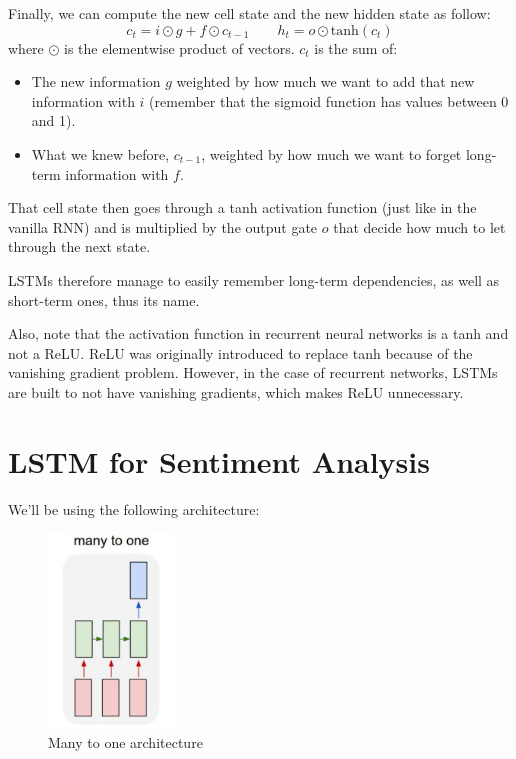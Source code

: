 Finally, we can compute the new cell state and the new hidden state as follow:
\begin{equation}
     c_t = i\odot g + f\odot c_{t-1} \qquad h_t = o\odot \text{tanh}(c_t)
\end{equation}
where $\odot$ is the elementwise product of vectors.
$c_t$ is the sum of:
\begin{itemize}
    \item The new information $g$ weighted by how much we want to add that new information with $i$ (remember that the sigmoid function has values between 0 and 
    1).
    \item What we knew before, $c_{t-1}$, weighted by how much we want to forget long-term information with $f$.
\end{itemize} 
That cell state then goes through a tanh activation function (just like in the vanilla RNN) and is multiplied by the output gate $o$ that decide how much to let through the next state. 

LSTMs therefore manage to easily remember long-term dependencies, as well as short-term ones, thus its name.

Also, note that the activation function in recurrent neural networks is a tanh and not a ReLU. ReLU was originally introduced to replace tanh because of the vanishing gradient problem. However, in the case of recurrent networks, LSTMs are built to not have vanishing gradients, which makes ReLU unnecessary.

\newpage
\section{LSTM for Sentiment Analysis}
We'll be using the following architecture:

\begin{figure}[H]
    \centering
    \includegraphics[width=0.3\textwidth]{Images/many-to-one.png}
    \caption{Many to one architecture}
\end{figure}


